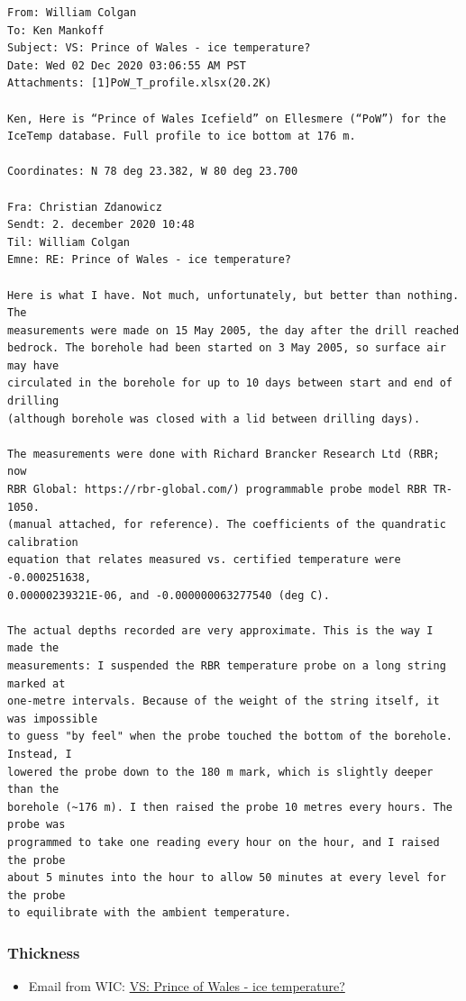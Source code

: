 \documentclass[article,a4paper,times,11pt,twoside]{article}
\begin{document}
\begin{verbatim}
From: William Colgan
To: Ken Mankoff
Subject: VS: Prince of Wales - ice temperature?
Date: Wed 02 Dec 2020 03:06:55 AM PST
Attachments: [1]PoW_T_profile.xlsx(20.2K)

Ken, Here is “Prince of Wales Icefield” on Ellesmere (“PoW”) for the IceTemp database. Full profile to ice bottom at 176 m.

Coordinates: N 78 deg 23.382, W 80 deg 23.700

Fra: Christian Zdanowicz
Sendt: 2. december 2020 10:48
Til: William Colgan
Emne: RE: Prince of Wales - ice temperature?

Here is what I have. Not much, unfortunately, but better than nothing. The
measurements were made on 15 May 2005, the day after the drill reached
bedrock. The borehole had been started on 3 May 2005, so surface air may have
circulated in the borehole for up to 10 days between start and end of drilling
(although borehole was closed with a lid between drilling days).

The measurements were done with Richard Brancker Research Ltd (RBR; now
RBR Global: https://rbr-global.com/) programmable probe model RBR TR-1050.
(manual attached, for reference). The coefficients of the quandratic calibration
equation that relates measured vs. certified temperature were -0.000251638,
0.00000239321E-06, and -0.000000063277540 (deg C).

The actual depths recorded are very approximate. This is the way I made the
measurements: I suspended the RBR temperature probe on a long string marked at
one-metre intervals. Because of the weight of the string itself, it was impossible
to guess "by feel" when the probe touched the bottom of the borehole. Instead, I
lowered the probe down to the 180 m mark, which is slightly deeper than the
borehole (~176 m). I then raised the probe 10 metres every hours. The probe was
programmed to take one reading every hour on the hour, and I raised the probe
about 5 minutes into the hour to allow 50 minutes at every level for the probe
to equilibrate with the ambient temperature.
\end{verbatim}


\subsubsection{Thickness}
\label{sec:orgb783cea}

\begin{itemize}
\item Email from WIC: \href{msgid:AM0PR04MB61293648564AB69ACA6A02CBA2F30@AM0PR04MB6129.eurprd04.prod.outlook.com}{VS: Prince of Wales - ice temperature?}
\end{itemize}
\end{document}
